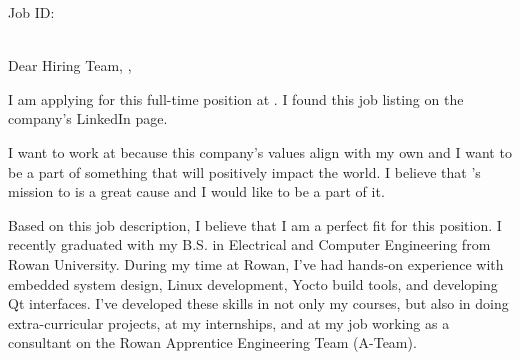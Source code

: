 \documentclass[11pt]{letter} %
\begin{document}
\begin{letter}{\companyaddress}
{
  \ifdefempty{\jobid}
    {}
    {Job ID: \jobid\\~\\}

  \companyaddress
}


\opening{
  Dear
\ifdefempty{\companyhiringmanager}
{Hiring Team,}
{\companyhiringmanager,}
}

I am applying for this full-time {\jobtitle} position at {\company}. I found
this job listing on the company's LinkedIn page.

I want to work at {\company} because this company's values
align with my own and I want to be a part of something that will
positively impact the world. I believe that {\company}'s mission to
{\companymission} is a great cause and I would like to be a part of it.

Based on this job description, I believe that I am a perfect fit for this
position.
I recently graduated with my B.S. in Electrical and Computer Engineering from
Rowan University. During my time at Rowan, I've had hands-on experience with
embedded system design, Linux development, Yocto build tools,
and developing Qt interfaces. I've developed these skills in not only my
courses, but also in doing extra-curricular projects, at my internships, and
at my job working as a consultant on the Rowan Apprentice Engineering
Team (A-Team).


\end{letter}
\end{document}

